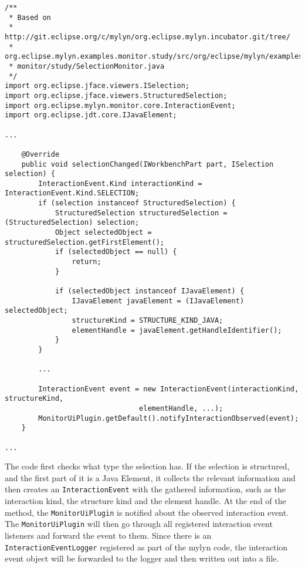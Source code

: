 \begin{lstlisting}
/** 
 * Based on
 * http://git.eclipse.org/c/mylyn/org.eclipse.mylyn.incubator.git/tree/
 * org.eclipse.mylyn.examples.monitor.study/src/org/eclipse/mylyn/examples/
 * monitor/study/SelectionMonitor.java
 */
import org.eclipse.jface.viewers.ISelection;
import org.eclipse.jface.viewers.StructuredSelection;
import org.eclipse.mylyn.monitor.core.InteractionEvent;
import org.eclipse.jdt.core.IJavaElement;

...

    @Override
    public void selectionChanged(IWorkbenchPart part, ISelection selection) {
		InteractionEvent.Kind interactionKind = InteractionEvent.Kind.SELECTION;
		if (selection instanceof StructuredSelection) {
			StructuredSelection structuredSelection = (StructuredSelection) selection;
			Object selectedObject = structuredSelection.getFirstElement();
			if (selectedObject == null) {
				return;
			}

			if (selectedObject instanceof IJavaElement) {
				IJavaElement javaElement = (IJavaElement) selectedObject;
				structureKind = STRUCTURE_KIND_JAVA;
				elementHandle = javaElement.getHandleIdentifier();
			}
		}

		...

		InteractionEvent event = new InteractionEvent(interactionKind, structureKind,
                                elementHandle, ...);
		MonitorUiPlugin.getDefault().notifyInteractionObserved(event);
	}

...
\end{lstlisting}

The code first checks what type the selection has. If the selection is structured, and the first part of it is a Java Element, it collects the relevant information and then creates an \texttt{InteractionEvent} with the gathered information, such as the interaction kind, the structure kind and the element handle. At the end of the method, the \texttt{MonitorUiPlugin} is notified about the observed interaction event. The \texttt{MonitorUiPlugin} will then go through all registered interaction event listeners and forward the event to them. Since there is an \texttt{InteractionEventLogger} registered as part of the mylyn code, the interaction event object will be forwarded to the logger and then written out into a file. 


\subsection{\CodingSpectator}
\label{CodingSpectator}

